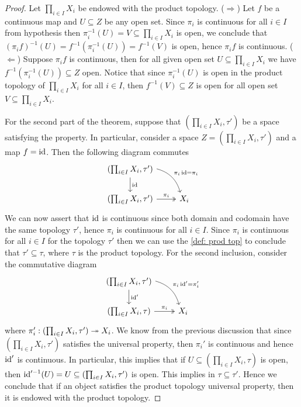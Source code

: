 \begin{proof}
  Let \(\prod_{i \in I} X_i\) be endowed with the product topology.
  (\(\Rightarrow\)) Let \(f\) be a continuous map and \(U \subseteq Z\) be any
  open set. Since \(\pi_i\) is continuous for all \(i \in I\) from hypothesis
  then \(\pi_i^{-1}(U) = V \subseteq \prod_{i \in I} X_i\) is open, we conclude
  that \((\pi_i  f)^{-1}(U) = f^{-1}(\pi_i^{-1}(U)) = f^{-1}(V)\) is open,
  hence \(\pi_i  f\) is continuous. (\(\Leftarrow\)) Suppose \(\pi_i
  f\) is continuous, then for all given open set \(U \subseteq \prod_{i \in I}
  X_i\) we have \(f^{-1}(\pi_i^{-1}(U)) \subseteq Z\) open. Notice that since
  \(\pi_i^{-1}(U)\) is open in the product topology of \(\prod_{i \in I} X_i\)
  for all \(i \in I\), then \(f^{-1}(V) \subseteq Z\) is open for all open set
  \(V \subseteq \prod_{i \in I} X_i\).

  For the second part of the theorem, suppose that \((\prod_{i \in I} X_i,
  \tau')\) be a space satisfying the property. In particular, consider a
  space \(Z = (\prod_{i \in I} X_i, \tau')\) and a map \(f = \operatorname{id}\). Then
  the following diagram commutes
  \[
    \begin{tikzcd}
      (\prod_{i \in I} X_i, \tau')
      \ar[d, "\Id"]
      \ar[dr, bend left, "\pi_i  \Id = \pi_i"] \\
      (\prod_{i \in I} X_i, \tau')
      \ar[r, two heads, "\pi_i"]
        &X_i
    \end{tikzcd}
  \]
  We can now assert that \(\operatorname{id}\) is continuous since both domain and codomain
  have the same topology \(\tau'\), hence \(\pi_i\) is continuous for all
  \(i \in I\). Since \(\pi_i\) is continuous for all \(i \in I\) for the
  topology \(\tau'\) then we can use the \cref{def: prod top} to conclude
  that \(\tau' \subseteq \tau\), where \(\tau\) is the product
  topology. For the second inclusion, consider the commutative diagram
  \[
    \begin{tikzcd}
      (\prod_{i \in I} X_i, \tau')
      \ar[d, "\Id'"]
      \ar[dr, bend left, "\pi_i  \Id' = \pi_i'"] \\
      (\prod_{i \in I} X_i, \tau)
      \ar[r, two heads, "\pi_i"]
        &X_i
    \end{tikzcd}
  \]
  where \(\pi_i': (\prod_{i \in I} X_i, \tau') \twoheadrightarrow X_i\). We know from
  the previous discussion that since \((\prod_{i \in I} X_i, \tau')\)
  satisfies the universal property, then \(\pi_i'\) is continuous and hence
  \(\operatorname{id}'\) is continuous. In particular, this implies that if  \(U \subseteq
  (\prod_{i \in I} X_i, \tau)\) is open, then \(\operatorname{id}'^{-1}(U) = U
  \subseteq (\prod_{i \in I} X_i, \tau')\) is open. This implies in
  \(\tau \subseteq \tau'\). Hence we conclude that if an object
  satisfies the product topology universal property, then it is endowed with the
  product topology.
\end{proof}

